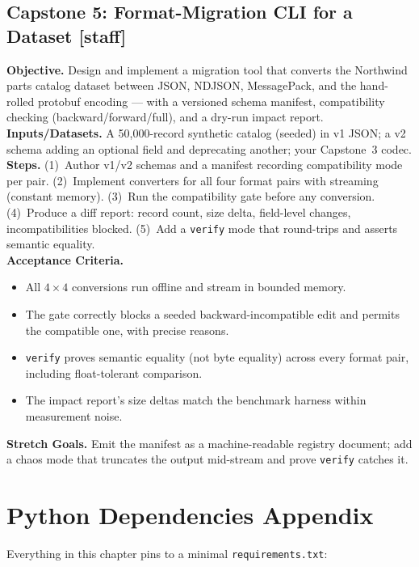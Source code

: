 \subsection{Capstone 5: Format-Migration CLI for a Dataset [staff]}
\textbf{Objective.} Design and implement a migration tool that converts the
Northwind parts catalog dataset between JSON, NDJSON, MessagePack, and the
hand-rolled protobuf encoding --- with a versioned schema manifest, compatibility
checking (backward/forward/full), and a dry-run impact report.\\
\textbf{Inputs/Datasets.} A 50{,}000-record synthetic catalog (seeded) in v1 JSON;
a v2 schema adding an optional field and deprecating another; your Capstone~3
codec.\\
\textbf{Steps.} (1)~Author v1/v2 schemas and a manifest recording compatibility
mode per pair. (2)~Implement converters for all four format pairs with streaming
(constant memory). (3)~Run the compatibility gate before any conversion.
(4)~Produce a diff report: record count, size delta, field-level changes,
incompatibilities blocked. (5)~Add a \texttt{verify} mode that round-trips and
asserts semantic equality.\\
\textbf{Acceptance Criteria.}
\begin{itemize}
  \item[$\square$] All $4 \times 4$ conversions run offline and stream in bounded
        memory.
  \item[$\square$] The gate correctly blocks a seeded backward-incompatible edit
        and permits the compatible one, with precise reasons.
  \item[$\square$] \texttt{verify} proves semantic equality (not byte equality)
        across every format pair, including float-tolerant comparison.
  \item[$\square$] The impact report's size deltas match the benchmark harness
        within measurement noise.
\end{itemize}
\textbf{Stretch Goals.} Emit the manifest as a machine-readable registry
document; add a chaos mode that truncates the output mid-stream and prove
\texttt{verify} catches it.

\section{Python Dependencies Appendix}
\label{sec:ch4-deps}

Everything in this chapter pins to a minimal \texttt{requirements.txt}:

